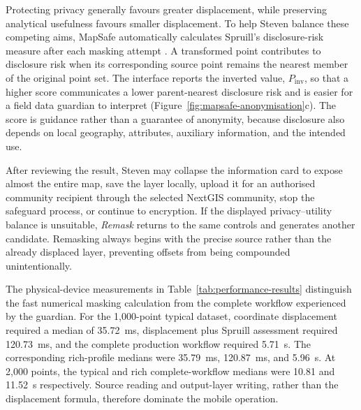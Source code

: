 \documentclass[a4paper,UKenglish,cleveref,autoref,thm-restate]{lipics-v2021}
\begin{document}
Protecting privacy generally favours greater displacement, while preserving analytical usefulness favours smaller displacement. To help Steven balance these competing aims, MapSafe automatically calculates Spruill's disclosure-risk measure after each masking attempt \citep{armstrong1999geographically,swanlund2020maskmy}. A transformed point contributes to disclosure risk when its corresponding source point remains the nearest member of the original point set.
The interface reports the inverted value, $P_{\mathrm{inv}}$, so that a higher score communicates a lower parent-nearest disclosure risk and is easier for a field data guardian to interpret (Figure~\ref{fig:mapsafe-anonymisation}c). The score is guidance rather than a guarantee of anonymity, because disclosure also depends on local geography, attributes, auxiliary information, and the intended use.

After reviewing the result, Steven may collapse the information card to expose almost the entire map, save the layer locally, upload it for an authorised community recipient through the selected NextGIS community, stop the safeguard process, or continue to encryption. If the displayed privacy--utility balance is unsuitable, \emph{Remask} returns to the same controls and generates another candidate. Remasking always begins with the precise source rather than the already displaced layer, preventing offsets from being compounded unintentionally.

The physical-device measurements in Table~\ref{tab:performance-results} distinguish the fast numerical masking calculation from the complete workflow experienced by the guardian. For the 1,000-point typical dataset, coordinate displacement required a median of 35.72~ms, displacement plus Spruill assessment required 120.73~ms, and the complete production workflow required 5.71~s. The corresponding rich-profile medians were 35.79~ms, 120.87~ms, and 5.96~s. At 2,000 points, the typical and rich complete-workflow medians were 10.81 and 11.52~s respectively. Source reading and output-layer writing, rather than the displacement formula, therefore dominate the mobile operation.
\end{document}
